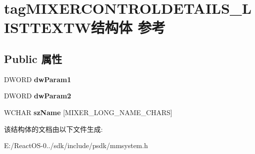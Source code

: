 \hypertarget{structtag_m_i_x_e_r_c_o_n_t_r_o_l_d_e_t_a_i_l_s___l_i_s_t_t_e_x_t_w}{}\section{tag\+M\+I\+X\+E\+R\+C\+O\+N\+T\+R\+O\+L\+D\+E\+T\+A\+I\+L\+S\+\_\+\+L\+I\+S\+T\+T\+E\+X\+T\+W结构体 参考}
\label{structtag_m_i_x_e_r_c_o_n_t_r_o_l_d_e_t_a_i_l_s___l_i_s_t_t_e_x_t_w}
\subsection*{Public 属性}
\begin{DoxyCompactItemize}
\item 
\mbox{\label{structtag_m_i_x_e_r_c_o_n_t_r_o_l_d_e_t_a_i_l_s___l_i_s_t_t_e_x_t_w_a2a345d474bfadf3c639b93eff999c45e}} 
D\+W\+O\+RD {\bfseries dw\+Param1}
\item 
\mbox{\label{structtag_m_i_x_e_r_c_o_n_t_r_o_l_d_e_t_a_i_l_s___l_i_s_t_t_e_x_t_w_a40b19feaccc29ae3a3c119075e38fe2b}} 
D\+W\+O\+RD {\bfseries dw\+Param2}
\item 
\mbox{\label{structtag_m_i_x_e_r_c_o_n_t_r_o_l_d_e_t_a_i_l_s___l_i_s_t_t_e_x_t_w_aed62001e1b6046245081daa706f45165}} 
W\+C\+H\+AR {\bfseries sz\+Name} \mbox{[}M\+I\+X\+E\+R\+\_\+\+L\+O\+N\+G\+\_\+\+N\+A\+M\+E\+\_\+\+C\+H\+A\+RS\mbox{]}
\end{DoxyCompactItemize}


该结构体的文档由以下文件生成\+:\begin{DoxyCompactItemize}
\item 
E\+:/\+React\+O\+S-\/0../sdk/include/psdk/mmsystem.\+h\end{DoxyCompactItemize}
